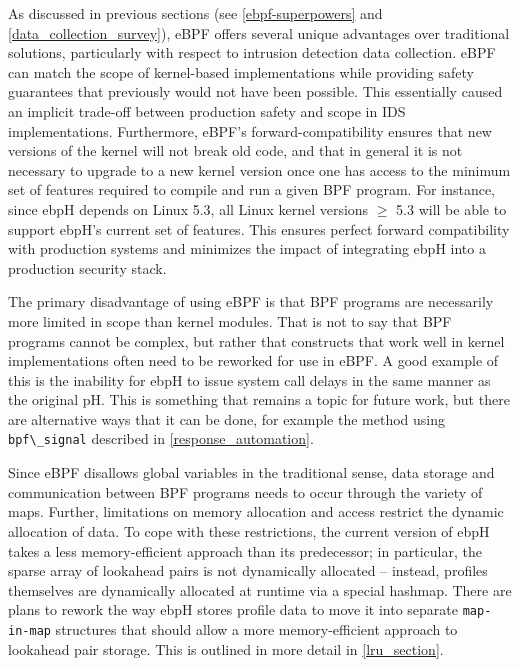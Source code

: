 \documentclass[
  12pt]{findlay}
\newcommand{\passthrough}[1]{#1}
\begin{document}
As discussed in previous sections (see \autoref{ebpf-superpowers} and
\autoref{data_collection_survey}), eBPF offers several unique advantages
over traditional solutions, particularly with respect to intrusion
detection data collection. eBPF can match the scope of kernel-based
implementations while providing safety guarantees that previously would
not have been possible. This essentially caused an implicit trade-off
between production safety and scope in IDS implementations. Furthermore,
eBPF's forward-compatibility ensures that new versions of the kernel
will not break old code, and that in general it is not necessary to
upgrade to a new kernel version once one has access to the minimum set
of features required to compile and run a given BPF program. For
instance, since ebpH depends on Linux 5.3, all Linux kernel versions
\(\ge\) 5.3 will be able to support ebpH's current set of features. This
ensures perfect forward compatibility with production systems and
minimizes the impact of integrating ebpH into a production security
stack.

The primary disadvantage of using eBPF is that BPF programs are
necessarily more limited in scope than kernel modules. That is not to
say that BPF programs cannot be complex, but rather that constructs that
work well in kernel implementations often need to be reworked for use in
eBPF. A good example of this is the inability for ebpH to issue system
call delays in the same manner as the original pH. This is something
that remains a topic for future work, but there are alternative ways
that it can be done, for example the method using
\passthrough{\lstinline!bpf\_signal!} described in
\autoref{response_automation}.

Since eBPF disallows global variables in the traditional sense, data
storage and communication between BPF programs needs to occur through
the variety of maps. Further, limitations on memory allocation and
access restrict the dynamic allocation of data. To cope with these
restrictions, the current version of ebpH takes a less memory-efficient
approach than its predecessor; in particular, the sparse array of
lookahead pairs is not dynamically allocated -- instead, profiles
themselves are dynamically allocated at runtime via a special hashmap.
There are plans to rework the way ebpH stores profile data to move it
into separate \passthrough{\lstinline!map-in-map!} structures that
should allow a more memory-efficient approach to lookahead pair storage.
This is outlined in more detail in \autoref{lru_section}.
\end{document}
